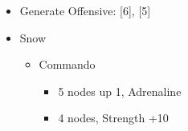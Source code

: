 	\begin{menu}
		\begin{itemize}
			\paradigm
			\begin{itemize}
				\item Generate Offensive: [6], [5]
			\end{itemize}
			\crystarium
			\begin{itemize}
				\item Snow
				      \begin{itemize}
					      \item Commando
					            \begin{itemize}
						            \item 5 nodes up 1, Adrenaline
						            \item 4 nodes, Strength +10
					            \end{itemize}
				      \end{itemize}
			\end{itemize}
		\end{itemize}
	\end{menu}
	\vfill
	\renewcommand{\first}{[1] Slash \& Burn (\com/\rav)}
	\renewcommand{\second}{[2] War \& Peace (\com/\med)}
	\renewcommand{\fifth}{[5] Dualcasting (\rav/\rav)}
	\renewcommand{\sixth}{[6] Dualcasting (\rav/\rav)}
